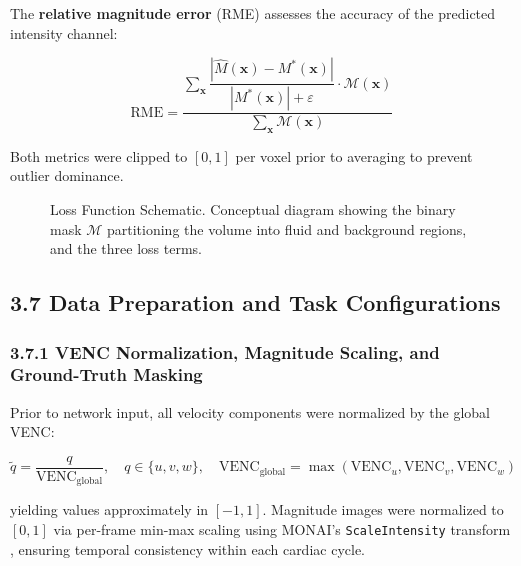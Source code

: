 \documentclass[11pt]{article}
\begin{document}
The \textbf{relative magnitude error} (RME) assesses the accuracy of the predicted intensity channel:

\begin{equation}
    \text{RME} = \frac{
        \sum_{\mathbf{x}} \dfrac{|\hat{M}(\mathbf{x}) - M^*(\mathbf{x})|}{|M^*(\mathbf{x})| + \varepsilon} \cdot \mathcal{M}(\mathbf{x})
    }{
        \sum_{\mathbf{x}} \mathcal{M}(\mathbf{x})
    }
\end{equation}

Both metrics were clipped to $[0, 1]$ per voxel prior to averaging to prevent outlier dominance.

\begin{figure}[!htbp]
    \centering
    \caption{Loss Function Schematic. Conceptual diagram showing the binary mask $\mathcal{M}$ partitioning the volume into fluid and background regions, and the three loss terms.}
    \label{fig:loss}
\end{figure}

\subsection*{3.7 Data Preparation and Task Configurations}

\subsubsection*{3.7.1 VENC Normalization, Magnitude Scaling, and Ground-Truth Masking}

Prior to network input, all velocity components were normalized by the global VENC:

\begin{equation}
    \tilde{q} = \frac{q}{\text{VENC}_{\text{global}}}, \quad q \in \{u, v, w\},
    \quad \text{VENC}_{\text{global}} = \max(\text{VENC}_u, \text{VENC}_v, \text{VENC}_w)
\end{equation}

yielding values approximately in $[-1, 1]$. Magnitude images were normalized to $[0, 1]$ via per-frame min-max scaling using MONAI's \texttt{ScaleIntensity} transform \cite{cardoso2022monai}, ensuring temporal consistency within each cardiac cycle.
\end{document}
